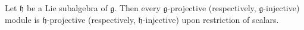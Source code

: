 Let $\mathfrak{h}$ be a Lie subalgebra of $\mathfrak{g}$. Then every $\mathfrak{g}$-projective (respectively, $\mathfrak{g}$-injective) module is $\mathfrak{h}$-projective (respectively, $\mathfrak{h}$-injective) upon restriction of scalars.
